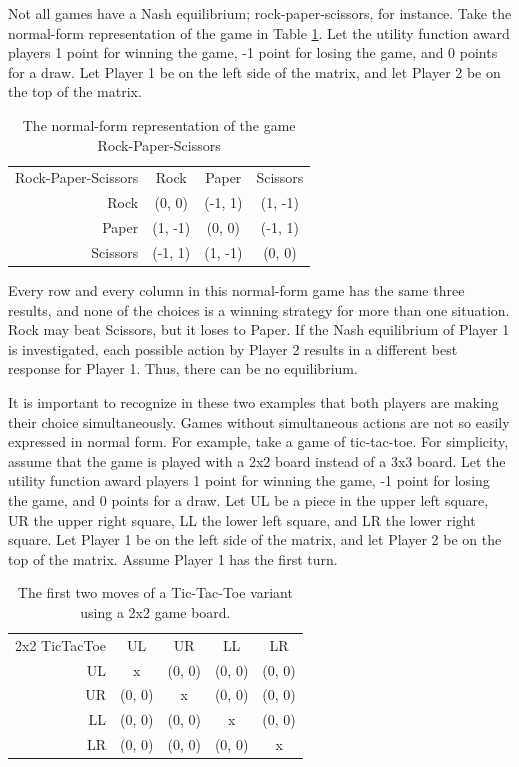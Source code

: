 Not all games have a Nash equilibrium; rock-paper-scissors, for instance. Take the normal-form representation of the game in Table \ref{table:RPS}. Let the utility function award players 1 point for winning the game, -1 point for losing the game, and 0 points for a draw. Let Player 1 be on the left side of the matrix, and let Player 2 be on the top of the matrix.
\begin{table}[h]
  \centering
  \begin{tabular}{r | c | c | c |}
    \multicolumn{1}{c}{Rock-Paper-Scissors}&\multicolumn{1}{c}{Rock}&\multicolumn{1}{c}{Paper}&\multicolumn{1}{c}{Scissors} \\ \cline{2-4}
    Rock & (0, 0) & (-1, 1) & (1, -1) \\ \cline{2-4}
    Paper & (1, -1) & (0, 0) & (-1, 1) \\ \cline{2-4}
    Scissors & (-1, 1) & (1, -1) & (0, 0) \\ \cline{2-4}
  \end{tabular}
  \caption{The normal-form representation of the game Rock-Paper-Scissors}
  \label{table:RPS}
\end{table}

Every row and every column in this normal-form game has the same three results, and none of the choices is a winning strategy for more than one situation. Rock may beat Scissors, but it loses to Paper. If the Nash equilibrium of Player 1 is investigated, each possible action by Player 2 results in a different best response for Player 1. Thus, there can be no equilibrium.

It is important to recognize in these two examples that both players are making their choice simultaneously. Games without simultaneous actions are not so easily expressed in normal form. For example, take a game of tic-tac-toe. For simplicity, assume that the game is played with a 2x2 board instead of a 3x3 board. Let the utility function award players 1 point for winning the game, -1 point for losing the game, and 0 points for a draw. Let UL be a piece in the upper left square, UR the upper right square, LL the lower left square, and LR the lower right square. Let Player 1 be on the left side of the matrix, and let Player 2 be on the top of the matrix. Assume Player 1 has the first turn.\\
\begin{table}[h]
  \centering
  \begin{tabular}{r | c | c | c | c |}
    \multicolumn{1}{c}{2x2 TicTacToe}&\multicolumn{1}{c}{UL}&\multicolumn{1}{c}{UR}&
    \multicolumn{1}{c}{LL}&\multicolumn{1}{c}{LR}\\ \cline{2-5}
    UL & x & (0, 0) & (0, 0) & (0, 0) \\ \cline{2-5}
    UR & (0, 0) & x & (0, 0) & (0, 0) \\ \cline{2-5}
    LL & (0, 0) & (0, 0) & x & (0, 0) \\ \cline{2-5}
    LR & (0, 0) & (0, 0) & (0, 0) & x \\ \cline{2-5}
  \end{tabular}
  \caption{The first two moves of a Tic-Tac-Toe variant using a 2x2 game board.}
  \label{table:2x2TTT}
\end{table}

